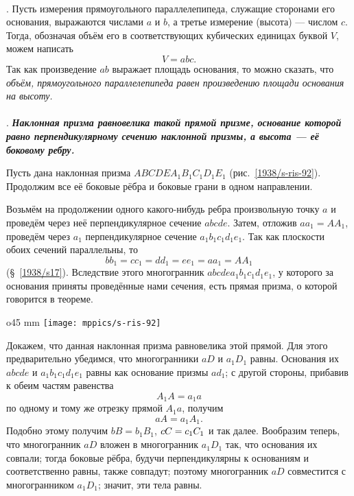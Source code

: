 \paragraph{}\label{1938/s85}
.
Пусть измерения прямоугольного параллелепипеда, служащие сторонами его основания, выражаются числами $a$ и $b$, а третье измерение (высота) — числом $c$.
Тогда, обозначая объём его в соответствующих кубических единицах буквой $V$, можем написать
\[V = abc.\]
Так как произведение $ab$ выражает площадь основания, то можно сказать, что \emph{объём, прямоугольного параллелепипеда равен произведению площади основания на высоту.}

\paragraph{}\label{1938/s86}
.
\textbf{\emph{Наклонная призма равновелика такой прямой призме, основание которой равно перпендикулярному сечению наклонной призмы, а высота — её боковому ребру.}}

Пусть дана наклонная призма $ABCDEA_1B_1C_1D_1E_1$ (рис.~\ref{1938/s-ris-92}).
Продолжим все её боковые рёбра и боковые грани в одном направлении.

Возьмём на продолжении одного какого-нибудь ребра произвольную точку $a$ и проведём через неё перпендикулярное сечение $abcde$.
Затем, отложив $aa_1=AA_1$, проведём через $a_1$ перпендикулярное сечение $a_1b_1c_1d_1e_1$.
Так как плоскости обоих сечений параллельны, то 
\[bb_1=cc_1=dd_1=ee_1=aa_1=AA_1\]
(§~\ref{1938/s17}).
Вследствие этого многогранник $abcdea_1b_1c_1d_1e_1$, у которого за основания приняты проведённые нами сечения, есть прямая призма, о которой говорится в теореме.

\begin{wrapfigure}[18]{o}{45 mm}
\vskip-0mm
\centering
\texttt{[image: mppics/s-ris-92]}
\caption{}\label{1938/s-ris-92}
\vskip-0mm
\end{wrapfigure}

Докажем, что данная наклонная призма равновелика этой прямой.
Для этого предварительно убедимся, что многогранники $aD$ и $a_1D_1$ равны.
Основания их $abcde$ и $a_1b_1c_1d_1e_1$ равны как основание призмы $ad_1$;
с другой стороны, прибавив к обеим частям равенства 
\[A_1A=a_1a\] по одному и тому же отрезку прямой $A_1a$, получим 
\[aA=a_1A_1.\] 
Подобно этому получим $bB=b_1B_1$, $cC\z=c_1C_1$ и так далее.
Вообразим теперь, что многогранник $aD$ вложен в многогранник $a_1D_1$ так, что основания их совпали;
тогда боковые рёбра, будучи перпендикулярны к основаниям и соответственно равны, также совпадут;
поэтому многогранник $aD$ совместится с многогранником $a_1D_1$;
значит, эти тела равны.

